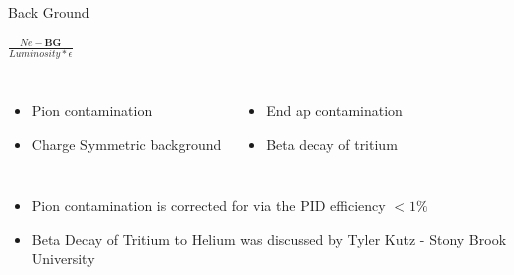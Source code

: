 \documentclass{beamer}
\begin{document}
\begin{frame}{Back Ground}
	\begin{block}{$\frac{Ne - \textbf{BG} }{Luminosity *  \epsilon}$}
		\begin{columns}
			\begin{itemize}
				\item Pion contamination
				\item Charge Symmetric background
			\end{itemize}
			\begin{itemize}
				\item End ap contamination
   				\item Beta decay of tritium
   			\end{itemize}
		\end{columns}	
		\begin{itemize}
			\item Pion contamination is corrected for via the PID efficiency  $ < 1\%$ 
			\item Beta Decay of Tritium to Helium was discussed by Tyler Kutz - Stony Brook University 
		\end{itemize}		
	\end{block}
\end{frame}
\end{document}
